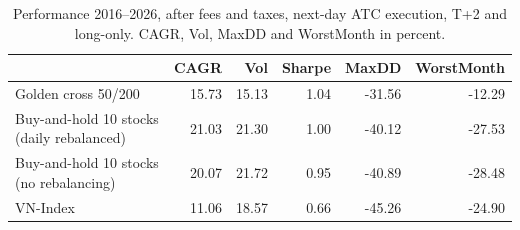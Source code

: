 \begin{table}
\caption{Performance 2016--2026, after fees and taxes, next-day ATC execution, T+2 and long-only. CAGR, Vol, MaxDD and WorstMonth in percent.}
\label{tab:main}
\begin{tabular}{lrrrrr}
\toprule
 & CAGR & Vol & Sharpe & MaxDD & WorstMonth \\
\midrule
Golden cross 50/200 & 15.73 & 15.13 & 1.04 & -31.56 & -12.29 \\
Buy-and-hold 10 stocks (daily rebalanced) & 21.03 & 21.30 & 1.00 & -40.12 & -27.53 \\
Buy-and-hold 10 stocks (no rebalancing) & 20.07 & 21.72 & 0.95 & -40.89 & -28.48 \\
VN-Index & 11.06 & 18.57 & 0.66 & -45.26 & -24.90 \\
\bottomrule
\end{tabular}
\end{table}
